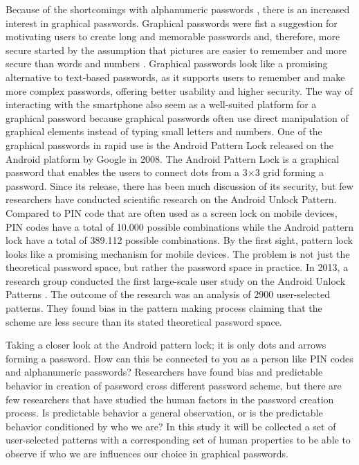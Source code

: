 		Because of the shortcomings with alphanumeric passwords \cite{UnixPasswords}, there is an increased interest in graphical passwords. Graphical passwords were fist a suggestion for motivating users to create long and memorable passwords and, therefore, more secure started by the assumption that pictures are easier to remember and more secure than words and numbers \cite{DeAngeli}. Graphical passwords look like a promising alternative to text-based passwords, as it supports users to remember and make more complex passwords, offering better usability and higher security. The way of interacting with the smartphone also seem as a well-suited platform for a graphical password because graphical passwords often use direct manipulation of graphical elements instead of typing small letters and numbers. One of the graphical passwords in rapid use is the Android Pattern Lock released on the Android platform by Google in 2008. The Android Pattern Lock is a graphical password that enables the users to connect dots from a 3$\times$3 grid forming a password. Since its release, there has been much discussion of its security, but few researchers have conducted scientific research on the Android Unlock Pattern. Compared to PIN code that are often used as a screen lock on mobile devices, PIN codes have a total of 10.000 possible combinations while the Android pattern lock have a total of 389.112 possible combinations. By the first sight, pattern lock looks like a promising mechanism for mobile devices. The problem is not just the theoretical password space, but rather the password space in practice. In 2013, a research group conducted the first large-scale user study on the Android Unlock Patterns \cite{Uellenbeck}. The outcome of the research was an analysis of 2900 user-selected patterns. They found bias in the pattern making process claiming that the scheme are less secure than its stated theoretical password space.

		Taking a closer look at the Android pattern lock; it is only dots and arrows forming a password. How can this be connected to you as a person like PIN codes and alphanumeric passwords? Researchers have found bias and predictable behavior in creation of password cross different password scheme, but there are few researchers that have studied the human factors in the password creation process. Is predictable behavior a general observation, or is the predictable behavior conditioned by who we are? In this study it will be collected a set of user-selected patterns with a corresponding set of human properties to be able to observe if who we are influences our choice in graphical passwords. 

